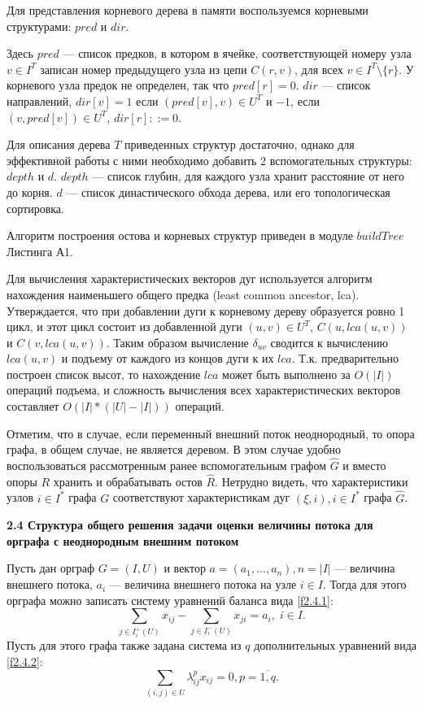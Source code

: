 \documentclass[14pt]{extarticle}%
\begin{document}
Для представления корневого дерева в памяти воспользуемся корневыми структурами: $pred$ и $dir$. 

Здесь $pred$ --- список предков, в котором в ячейке, соответствующей номеру узла $v\in I^T$ записан номер предыдущего узла из цепи $C(r,v)$, для всех $v\in I^T\setminus \{r\}$. У корневого узла предок не определен, так что $pred[r]=0$. $dir$ --- список направлений, $dir[v]=1$ если $(pred[v],v)\in U^T$ и $-1$, если $(v,pred[v])\in U^T$, $dir[r]::=0$.

Для описания дерева $T$ приведенных структур достаточно, однако для эффективной работы с ними необходимо добавить 2 вспомогательных структуры: $depth$ и $d$. $depth$ --- список глубин, для каждого узла хранит расстояние от него до корня. $d$ --- список династического обхода дерева, или его топологическая сортировка.

Алгоритм построения остова и корневых структур приведен в модуле $buildTree$ Листинга А1.

Для вычисления характеристических векторов дуг используется алгоритм нахождения наименьшего общего предка (least common ancestor, lca). Утверждается, что при добавлении дуги к корневому дереву образуется ровно 1 цикл, и этот цикл состоит из добавленной дуги $(u,v)\in U^T$, $C(u,lca(u,v))$ и $C(v,lca(u,v))$. Таким образом вычисление $\delta_{uv}$ сводится к вычислению $lca(u,v)$ и подъему от каждого из концов дуги к их $lca$. Т.к. предварительно построен список высот, то нахождение $lca$ может быть выполнено за $O(|I|)$ операций подъема, и сложность вычисления всех характеристических векторов составляет $O(|I|*(|U|-|I|))$ операций.

Отметим, что в случае, если переменный внешний поток неоднородный, то опора графа, в общем случае, не является деревом. В этом случае удобно воспользоваться рассмотренным ранее вспомогательным графом $\widehat{G}$ и вместо опоры $R$ хранить и обрабатывать остов $\widehat{R}$. Нетрудно видеть, что характеристики узлов $i\in I^*$ графа $G$ соответствуют характеристикам дуг $(\xi,i), i\in I^*$ графа $\widehat{G}$.

\textbf{2.4 Структура общего решения задачи оценки величины потока для орграфа с неоднородным внешним потоком}

Пусть дан орграф $G=(I,U)$ и вектор $a=(a_1, \ldots , a_n), n=|I|$ --- величина внешнего потока, $a_i$ --- величина внешнего потока на узле $i\in I$. Тогда для этого орграфа можно записать систему уравнений баланса вида \eqref{f2.4.1}:
\begin{equation}\label{f2.4.1}
	\sum_{j\in I^+_i(U)} x_{ij}-\sum_{j\in I^-_i(U)}x_{ji}=a_i,\; i\in I.
\end{equation}
Пусть для этого графа также задана система из $q$ дополнительных уравнений вида \eqref{f2.4.2}:
\begin{equation}\label{f2.4.2}
	\sum_{(i,j)\in U}\lambda^{p}_{ij}x_{ij}=0, p=\overline{1,q}.
\end{equation}
\end{document}
